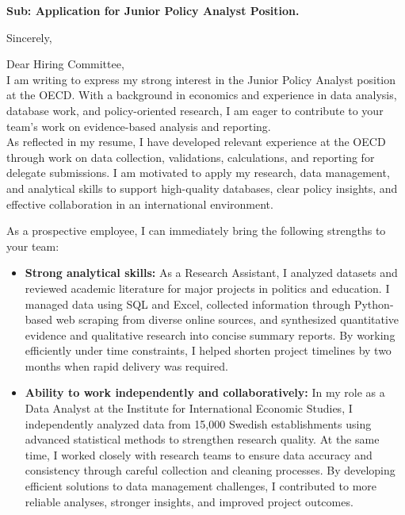 \documentclass[11pt,a4paper,roman]{moderncv}
\begin{document}
\date{\today}
\opening{\textbf{Sub: Application for Junior Policy Analyst Position.}}
\closing{Sincerely, \vspace{-1em}}


\makelettertitle



Dear Hiring Committee,
\\
\vspace{1em}
I am writing to express my strong interest in the Junior Policy Analyst position at the OECD. With a background in economics and experience in data analysis, database work, and policy-oriented research, I am eager to contribute to your team’s work on evidence-based analysis and reporting.\\

\vspace{1em}
As reflected in my resume, I have developed relevant experience at the OECD through work on data collection, validations, calculations, and reporting for delegate submissions. I am motivated to apply my research, data management, and analytical skills to support high-quality databases, clear policy insights, and effective collaboration in an international environment.\\
\vspace{1em}

As a prospective employee, I can immediately bring the following strengths to your team:
\vspace{0.5em}
\begin{itemize}
\item \textbf{Strong analytical skills:} As a Research Assistant, I analyzed datasets and reviewed academic literature for major projects in politics and education. I managed data using SQL and Excel, collected information through Python-based web scraping from diverse online sources, and synthesized quantitative evidence and qualitative research into concise summary reports. By working efficiently under time constraints, I helped shorten project timelines by two months when rapid delivery was required.
\item \textbf{Ability to work independently and collaboratively:} In my role as a Data Analyst at the Institute for International Economic Studies, I independently analyzed data from 15,000 Swedish establishments using advanced statistical methods to strengthen research quality. At the same time, I worked closely with research teams to ensure data accuracy and consistency through careful collection and cleaning processes. By developing efficient solutions to data management challenges, I contributed to more reliable analyses, stronger insights, and improved project outcomes.
\end{itemize}
\end{document}
